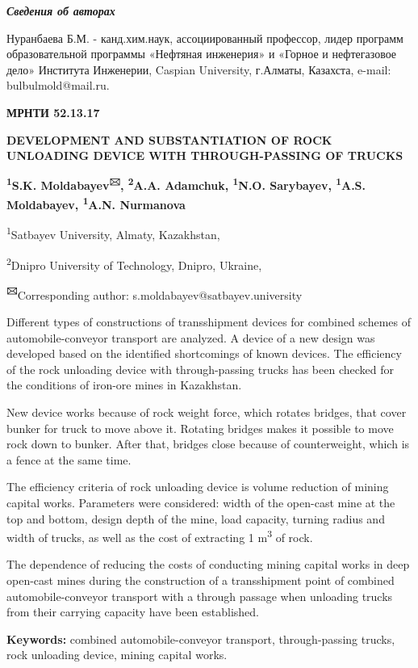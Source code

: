 \emph{{\bfseries Сведения об авторах}}

Нуранбаева Б.М. - канд.хим.наук, ассоциированный профессор, лидер
программ образовательной программы «Нефтяная инженерия» и «Горное и
нефтегазовое дело» Института Инженерии, Caspian University, г.Алматы,
Казахста, e-mail: bulbulmold@mail.ru.

\emph{{\bfseries \hfill\break
}}\newpage
{\bfseries МРНТИ 52.13.17}

{\bfseries DEVELOPMENT AND SUBSTANTIATION OF ROCK UNLOADING DEVICE WITH
THROUGH-PASSING OF TRUCKS}

{\bfseries \textsuperscript{1}S.K. Moldabayev\textsuperscript{🖂},
\textsuperscript{2}A.A. Adamchuk, \textsuperscript{1}N.O. Sarybayev,
\textsuperscript{1}A.S. Moldabayev, \textsuperscript{1}A.N. Nurmanova}

\textsuperscript{1}Satbayev University, Almaty, Kazakhstan,

\textsuperscript{2}Dnipro University of Technology, Dnipro, Ukraine,

{\bfseries \textsuperscript{🖂}}Corresponding author:
s.moldabayev@satbayev.university

Different types of constructions of transshipment devices for combined
schemes of automobile-conveyor transport are analyzed. A device of a new
design was developed based on the identified shortcomings of known
devices. The efficiency of the rock unloading device with
through-passing trucks has been checked for the conditions of iron-ore
mines in Kazakhstan.

New device works because of rock weight force, which rotates bridges,
that cover bunker for truck to move above it. Rotating bridges makes it
possible to move rock down to bunker. After that, bridges close because
of counterweight, which is a fence at the same time.

The efficiency criteria of rock unloading device is volume reduction of
mining capital works. Parameters were considered: width of the open-cast
mine at the top and bottom, design depth of the mine, load capacity,
turning radius and width of trucks, as well as the cost of extracting 1
m\textsuperscript{3} of rock.

The dependence of reducing the costs of conducting mining capital works
in deep open-cast mines during the construction of a transshipment point
of combined automobile-conveyor transport with a through passage when
unloading trucks from their carrying capacity have been established.

{\bfseries Keywords:} combined automobile-conveyor transport,
through-passing trucks, rock unloading device, mining capital works.

